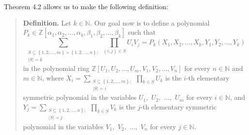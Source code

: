 \documentclass[numbers=enddot,12pt,final,onecolumn,notitlepage]{scrartcl}%
\begin{document}
Theorem 4.2 allows us to make the following definition:

\begin{quote}
\textbf{Definition.} Let $k\in\mathbb{N}$. Our goal now is to define a
polynomial $P_{k}\in\mathbb{Z}\left[  \alpha_{1},\alpha_{2},...,\alpha
_{k},\beta_{1},\beta_{2},...,\beta_{k}\right]  $ such that%
\begin{equation}
\sum_{\substack{S\subseteq\left\{  1,2,...,m\right\}  \times\left\{
1,2,...,n\right\}  ;\\\left\vert S\right\vert =k}}\prod_{\left(  i,j\right)
\in S}U_{i}V_{j}=P_{k}\left(  X_{1},X_{2},...,X_{k},Y_{1},Y_{2},...,Y_{k}%
\right)  \label{Pk1}%
\end{equation}
in the polynomial ring $\mathbb{Z}\left[  U_{1},U_{2},...,U_{m},V_{1}%
,V_{2},...,V_{n}\right]  $ for every $n\in\mathbb{N}$ and $m\in\mathbb{N}$,
where $X_{i}=\sum\limits_{\substack{S\subseteq\left\{  1,2,...,m\right\}
;\\\left\vert S\right\vert =i}}\prod\limits_{k\in S}U_{k}$ is the $i$-th
elementary symmetric polynomial in the variables $U_{1},$ $U_{2},$ $...,$
$U_{m}$ for every $i\in\mathbb{N}$, and $Y_{j}=\sum
\limits_{\substack{S\subseteq\left\{  1,2,...,n\right\}  ;\\\left\vert
S\right\vert =j}}\prod\limits_{k\in S}V_{k}$ is the $j$-th elementary
symmetric polynomial in the variables $V_{1},$ $V_{2},$ $...,$ $V_{n}$ for
every $j\in\mathbb{N}$.


\end{quote}
\end{document}
